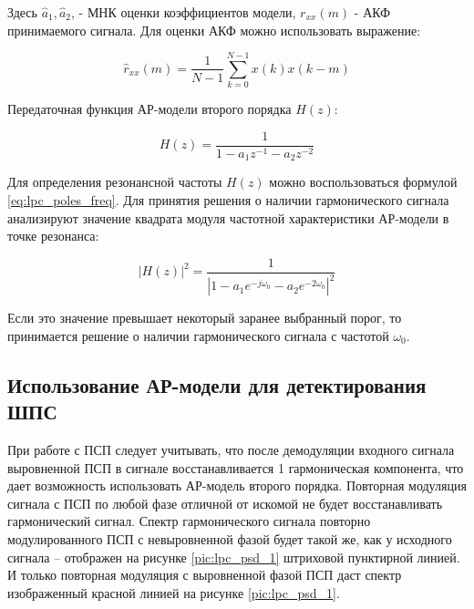 Здесь ${\hat{a}_1, \hat{a}_2}$, - МНК оценки коэффициентов модели, ${r_{xx}(m)}$ - АКФ принимаемого сигнала.
Для оценки АКФ  можно использовать выражение:

\begin{center}
\begin{equation}
	\label{eq:lpc_rxx_estimation}
	\hat{r}_{xx}(m) = \frac{1}{N-1} \sum \limits_{k=0}^{N-1} x(k)x(k-m)
\end{equation}
\end{center}

Передаточная функция АР-модели второго порядка ${H(z)}$:
\begin{center}
\begin{equation}
	\label{eq:lpc_spectral_func}
	H(z) = \frac{1}{1 - a_1 z^{-1} - a_2 z^{-2}}
\end{equation}
\end{center}

Для определения резонансной частоты ${H(z)}$ можно воспользоваться формулой \ref{eq:lpc_poles_freq}.
Для принятия решения о наличии гармонического сигнала анализируют значение квадрата модуля частотной
характеристики АР-модели в точке резонанса:

\begin{center}
\begin{equation}
	\label{eq:lpc_power_cos}
	\left| H(z) \right|^2 = \frac{1}{\left| 1 - a_1 e^{-j \omega_0} - a_2 e^{-2 \omega_0} \right|^2}
\end{equation}
\end{center}

Если это значение превышает некоторый заранее выбранный порог, то принимается решение о наличии гармонического
сигнала с частотой ${\omega_0}$. 

\subsection{Использование АР-модели для детектирования ШПС}

При работе с ПСП следует учитывать, что после демодуляции входного сигнала выровненной ПСП в сигнале восстанавливается 1 гармоническая
компонента, что дает возможность использовать АР-модель второго порядка.
Повторная модуляция сигнала с ПСП по любой фазе отличной от искомой не будет восстанавливать гармонический сигнал.
Спектр гармонического сигнала повторно модулированного ПСП с невыровненной фазой будет такой же, как у исходного сигнала – отображен
на рисунке \ref{pic:lpc_psd_1} штриховой пунктирной линией. И только повторная модуляция с выровненной фазой ПСП даст спектр
изображенный красной линией на рисунке \ref{pic:lpc_psd_1}.


